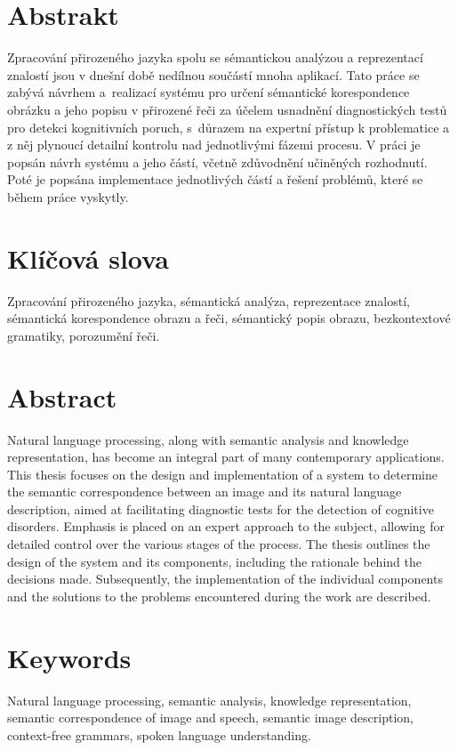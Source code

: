 \section*{Abstrakt}
Zpracování přirozeného jazyka spolu se sémantickou analýzou a reprezentací znalostí jsou v dnešní době nedílnou součástí mnoha aplikací.
Tato práce se zabývá návrhem a~realizací systému pro určení sémantické korespondence obrázku a jeho popisu v přirozené řeči
za účelem usnadnění diagnostických testů pro detekci kognitivních poruch, s~důrazem na expertní přístup k problematice a z něj
plynoucí detailní kontrolu nad jednotlivými fázemi procesu.
V práci je popsán návrh systému a jeho částí, včetně zdůvodnění učiněných rozhodnutí.
Poté je popsána implementace jednotlivých částí a řešení problémů, které se během práce vyskytly.

\section*{Klíčová slova}
Zpracování přirozeného jazyka, sémantická analýza, reprezentace znalostí, sémantická korespondence obrazu a řeči, sémantický popis obrazu,
bezkontextové gramatiky, porozumění řeči.

\thispagestyle{empty}
\newpage

\section*{Abstract}
Natural language processing, along with semantic analysis and knowledge representation, has become an integral part of many contemporary applications.
This thesis focuses on the design and implementation of a system to determine the semantic correspondence between an image and its natural language description,
aimed at facilitating diagnostic tests for the detection of cognitive disorders.
Emphasis is placed on an expert approach to the subject, allowing for detailed control over the various stages of the process.
The thesis outlines the design of the system and its components,
including the rationale behind the decisions made.
Subsequently, the implementation of the individual components and the solutions to the problems encountered during the work are described.


\section*{Keywords}
Natural language processing, semantic analysis, knowledge representation, semantic correspondence of image and speech, semantic image description,
context-free grammars, spoken language understanding.
\thispagestyle{empty}
